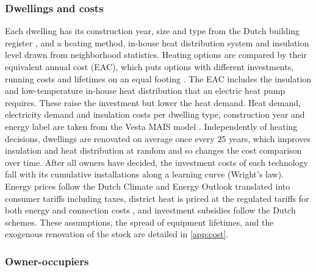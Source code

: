 \documentclass[preprint,12pt,authoryear]{elsarticle}
\begin{document}
\subsubsection{Dwellings and costs}

Each dwelling has its construction year, size and type from the Dutch
building register \citep{kadasterDatasetBasisregistratieAdressen2022}, and a
heating method, in-house heat distribution system and insulation level drawn
from neighborhood statistics. Heating options are compared by their
equivalent annual cost (EAC), which puts options with different investments,
running costs and lifetimes on an equal footing
\citep{hastingsFinancialMethods2021}. The EAC includes the insulation and
low-temperature in-house heat distribution that an electric heat pump requires. 
These raise
the investment but lower the heat demand. Heat demand, electricity demand and
insulation costs per dwelling type, construction year and energy label are
taken from the Vesta MAIS model \citep{pblHetVestaMAIS2017,
vandermolenFunctioneelOntwerpVesta2021}. Independently of heating decisions,
dwellings are renovated on average once every 25 years, which improves
insulation and heat distribution at random and so changes the cost comparison
over time. After all owners have decided, the investment costs of each
technology fall with its cumulative installations along a learning curve
(Wright's law). Energy prices follow the Dutch Climate and Energy Outlook
\citep{pbl_kev_2025} translated into consumer tariffs including taxes,
district heat is priced at the regulated tariffs for both energy and
connection costs \citep{marktTarievenWarmteKoude}, and investment subsidies
follow the Dutch schemes. These assumptions, the spread of equipment
lifetimes, and the exogenous renovation of the stock are detailed in
\ref{app:cost}.

\subsubsection{Owner-occupiers}
\end{document}
